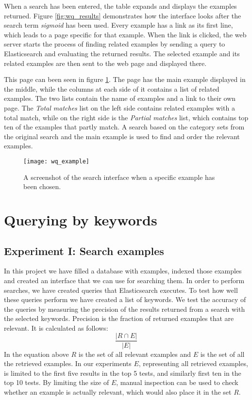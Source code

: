 When a search has been entered, the table expands and displays the examples returned. Figure \ref{fig:wq_results} demonstrates how the interface looks after the search term \textit{sigmoid} has been used. Every example has a link as its first line, which leads to a page specific for that example. When the link is clicked, the web server starts the process of finding related examples by sending a query to Elasticsearch and evaluating the returned results. The selected example and its related examples are then sent to the web page and displayed there.

This page can been seen in figure \ref{fig:wq_example}. The page has the main example displayed in the middle, while the columns at each side of it contains a list of related examples. The two lists contain the name of examples and a link to their own page. The \textit{Total matches} list on the left side contains related examples with a total match, while on the right side is the \textit{Partial matches} list, which contains top ten of the examples that partly match. A search based on the category sets from the original search and the main example is used to find and order the relevant examples.

\begin{figure}[H] 
\caption{A screenshot of the search interface when a specific example has been chosen.}
\texttt{[image: wq\_example]}
\label{fig:wq_example}
\end{figure}

\section{Querying by keywords} \label{5:keywords}

\subsection{Experiment I: Search examples} \label{search_experiment}
In this project we have filled a database with examples, indexed those examples and created an interface that we can use for searching them. In order to perform searches, we have created queries that Elasticsearch executes. To test how well these queries perform we have created a list of keywords. We test the accuracy of the queries by measuring the precision of the results returned from a search with the selected  keywords. Precision is the fraction of returned examples that are relevant. It is calculated as follows:
\[\frac{|R \cap E |}{|E|}\]
In the equation above \(R\) is the set of all relevant examples and \(E\) is the set of all the retrieved examples.
In our experiments \(E\), representing all retrieved examples, is limited to the first five results in the top 5 tests, and similarly first ten in the top 10 tests. By limiting the size of \(E\), manual inspection can be used to check whether an example is actually relevant, which would also place it in the set \(R\).


